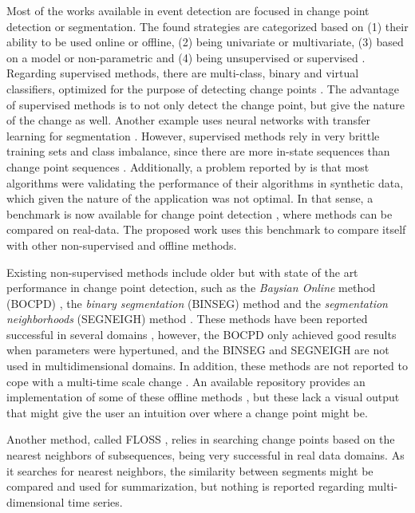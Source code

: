 Most of the works available in event detection are focused in change point detection or segmentation. The found strategies are categorized based on (1) their ability to be used online or offline, (2) being univariate or multivariate, (3) based on a model or non-parametric and (4) being unsupervised or supervised \cite{cpd_alan, review_1, review_2}. Regarding supervised methods, there are multi-class, binary and virtual classifiers, optimized for the purpose of detecting change points \cite{review_1}. The advantage of supervised methods is to not only detect the change point, but give the nature of the change as well. Another example uses neural networks with transfer learning for segmentation \cite{pedromatias}. However, supervised methods rely in very brittle training sets and class imbalance, since there are more in-state sequences than change point sequences \cite{review_1}. Additionally, a problem reported by \cite{cpd_alan} is that most algorithms were validating the performance of their algorithms in synthetic data, which given the nature of the application was not optimal. In that sense, a benchmark is now available for change point detection \cite{cpd_alan}, where methods can be compared on real-data. The proposed work uses this benchmark to compare itself with other non-supervised and offline methods.
\par
Existing non-supervised methods include older but with state of the art performance in change point detection, such as the \textit{Baysian Online} method (BOCPD) \cite{bocpd}, the \textit{binary segmentation} (BINSEG) method \cite{binseg} and the \textit{segmentation neighborhoods} (SEGNEIGH) method \cite{segneigh}. These methods have been reported successful in several domains \cite{cpd_alan}, however, the BOCPD only achieved good results when parameters were hypertuned, and the BINSEG and SEGNEIGH are not used in multidimensional domains. In addition, these methods are not reported to cope with a multi-time scale change \cite{cpd_alan}. An available repository provides an implementation of some of these offline methods \cite{review_2}, but these lack a visual output that might give the user an intuition over where a change point might be. 
\par
Another method, called FLOSS \cite{eamonn1}, relies in searching change points based on the nearest neighbors of subsequences, being very successful in real data domains. As it searches for nearest neighbors, the similarity between segments might be compared and used for summarization, but nothing is reported regarding multi-dimensional time series.
